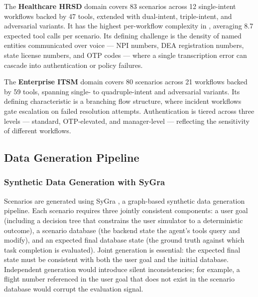 The \textbf{Healthcare HRSD} domain covers 83 scenarios across 12 single-intent workflows backed by 47 tools, extended with dual-intent, triple-intent, and adversarial variants. It has the highest per-workflow complexity in \framework, averaging 8.7 expected tool calls per scenario. Its defining challenge is the density of named entities communicated over voice --- NPI numbers, DEA registration numbers, state license numbers, and OTP codes --- where a single transcription error can cascade into authentication or policy failures.

The \textbf{Enterprise ITSM} domain covers 80 scenarios across 21 workflows backed by 59 tools, spanning single- to quadruple-intent and adversarial variants. Its defining characteristic is a branching flow structure, where incident workflows gate escalation on failed resolution attempts. Authentication is tiered across three levels --- standard, OTP-elevated, and manager-level --- reflecting the sensitivity of different workflows.




\subsection{Data Generation Pipeline}
\label{app:data-generation}

\subsubsection*{Synthetic Data Generation with SyGra}

Scenarios are generated using SyGra \cite{pradhan2025sygra}, a graph-based synthetic data generation pipeline. Each scenario requires three jointly consistent components: a user goal (including a decision tree that constrains the user simulator to a deterministic outcome), a scenario database (the backend state the agent's tools query and modify), and an expected final database state (the ground truth against which task completion is evaluated). Joint generation is essential: the expected final state must be consistent with both the user goal and the initial database. Independent generation would introduce silent inconsistencies; for example, a flight number referenced in the user goal that does not exist in the scenario database would corrupt the evaluation signal.

